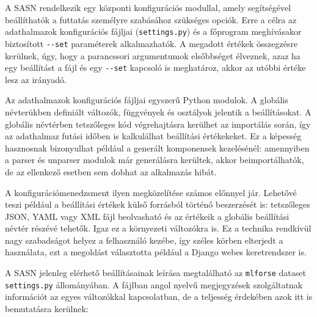 \documentclass[twoside, 12pt]{report}
\begin{document}
A SASN rendelkezik egy központi konfigurációs modullal, amely segítségével beállíthatók a futtatás személyre szabásához szükséges opciók. Erre a célra az adathalmazok konfigurációs fájljai (\verb|settings.py|) és a főprogram meghívásakor biztosított \verb|--set| paraméterek alkalmazhatók. A megadott értékek összegzésre kerülnek, úgy, hogy a parancssori argumentumok elsőbbséget élveznek, azaz ha egy beállítást a fájl és egy \verb|--set| kapcsoló is meghatároz, akkor az utóbbi értéke lesz az irányadó.

Az adathalmazok konfigurációs fájljai egyszerű Python modulok. A globális névterükben definiált változók, függvények és osztályok jelentik a beállításokat. A globális névtérben tetszőleges kód végrehajtásra kerülhet az importálás során, így az adathalmaz futási időben is kalkulálhat beállítási értékekeket. Ez a képesség hasznosnak bizonyulhat például a generált komponensek kezelésénél: amennyiben a parser és unparser modulok már generálásra kerültek, akkor beimportálhatók, de az ellenkező esetben sem dobhat az alkalmazás hibát.

A konfigurációmenedzsment ilyen megközelítése számos előnnyel jár. Lehetővé teszi például a beállítási értékek külső forrásból történő beszerzését is: tetszőleges JSON, YAML vagy XML fájl beolvasható és az értékeik a globális beállítási névtér részévé tehetők. Igaz ez a környezeti változókra is. Ez a technika rendkívül nagy szabadságot helyez a felhasználó kezébe, így széles körben elterjedt a használata, ezt a megoldást választotta például a Django webes keretrendszer is.

A SASN jelenleg elérhető beállításainak leírása megtalálható az \verb|mlforse| dataset \verb|settings.py| állományában. A fájlban angol nyelvű megjegyzések szolgáltatnak információt az egyes változókkal kapcsolatban, de a teljesség érdekében azok itt is bemutatásra kerülnek:
\end{document}
